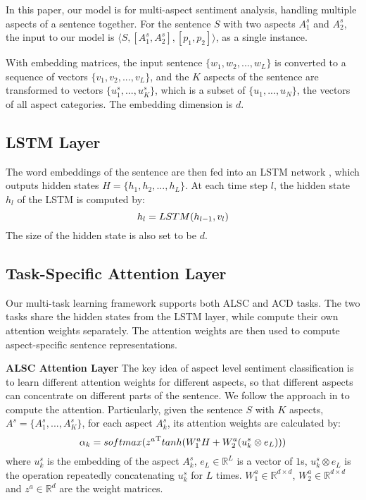 \documentclass[11pt,a4paper]{article}
\begin{document}
In this paper, our model is for multi-aspect sentiment analysis, handling multiple aspects of a sentence together. For the sentence $S$ with two aspects $A_1^s$ and $A_2^s$, the input to our model is $\langle{S, [A_1^s, A_2^s], [p_1, p_2]}\rangle$, as a single instance.

With embedding matrices, the input sentence $\{w_1, w_2, ..., w_L\}$ is converted to a sequence of vectors $\{v_1,v_2,...,v_L\}$, and the $K$ aspects of the sentence are transformed to vectors $\{u_1^s,...,u_K^s\}$, which is a subset of $\{u_1,...,u_N\}$, the vectors of all aspect categories. The embedding dimension is $d$.

\subsection{LSTM Layer}
The word embeddings of the sentence are then fed into an LSTM network \cite{Hochreiter1997Long}, which outputs hidden states $H=\{h_1,h_2,...,h_L\}$. At each time
step $l$, the hidden state $h_l$ of the LSTM is computed
by:
\begin{equation} 
\setlength{\abovedisplayskip}{4pt}  %
\setlength{\belowdisplayskip}{4pt}  %
   h_l = LSTM(h_{l-1},v_l)
\end{equation}
The size of the hidden state is also set to be $d$.

\subsection{Task-Specific Attention Layer}
Our multi-task learning framework supports both ALSC and ACD tasks. The two tasks share the hidden states from the LSTM layer, while compute their own attention weights separately. The attention weights are then used to compute aspect-specific sentence representations. 

{\bf ALSC Attention Layer}
The key idea of aspect level sentiment classification is to learn different attention weights for different aspects, so that different aspects can concentrate on different parts of the sentence. 
We follow the approach in \cite{Bahdanau2015iclr} to compute the attention. Particularly, given the sentence $S$ with $K$ aspects, $A^s=\{A_1^s,...,A_K^s\}$, for each aspect $A_k^s$, its attention weights are calculated by:
\begin{equation} 
\setlength{\abovedisplayskip}{4pt}  %
\setlength{\belowdisplayskip}{4pt}  %
    \alpha_k = softmax({z^a}^\mathrm{T}tanh(W_{1}^{a}{H} + W_{2}^{a}(u_k^{s}\otimes{e_L}))) 
  \label{equation_absa_att}
\end{equation}
where $u_k^{s}$ is the embedding of the aspect $A_k^s$, $e_L\in\mathbb{R}^{L}$ is a
vector of $1$s, ${u_k^{s}}\otimes{e_L}$ is the operation repeatedly concatenating $u_k^{s}$ for $L$ times. $W_{1}^a\in\mathbb{R}^{{d}\times{d}}$, $W_{2}^a\in\mathbb{R}^{{d}\times{d}}$ and $z^a\in\mathbb{R}^{d}$ are the weight matrices.
\end{document}
